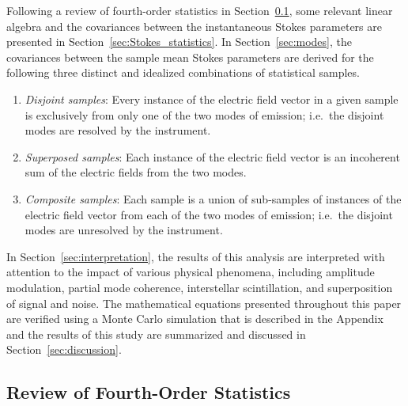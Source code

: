 \documentclass[twocolumn]{aastex6}
\newcommand{\Sec}[1]{Section~\ref{sec:#1}}
\begin{document}
Following a review of fourth-order statistics in \Sec{review}, some
relevant linear algebra and the covariances between the instantaneous
Stokes parameters are presented in \Sec{Stokes_statistics}.
%
In \Sec{modes}, the covariances between the sample mean Stokes
parameters are derived for the following three
distinct and idealized combinations of statistical samples.
%
\begin{enumerate}
\item \emph{Disjoint samples}: Every instance of the electric field vector in
  a given sample is exclusively from only one of the two modes of emission;
  i.e.\ the disjoint modes are resolved by the instrument.
\item \emph{Superposed samples}: Each instance of the electric field vector
  is an incoherent sum of the electric fields from the two modes.
\item \emph{Composite samples}: Each sample is a union of sub-samples of instances
  of the electric field vector from each of the two modes of emission;
  i.e.\ the disjoint modes are unresolved by the instrument.
\end{enumerate}
%
In \Sec{interpretation}, the results of this analysis are interpreted
with attention to the impact of various physical phenomena, including
amplitude modulation, partial mode coherence, interstellar
scintillation, and superposition of signal and noise.
%
The mathematical equations presented throughout this paper are
verified using a Monte Carlo simulation that is described in the
Appendix and the results of this study are summarized and discussed in
\Sec{discussion}.




\subsection{Review of Fourth-Order Statistics}
\label{sec:review}
\end{document}

